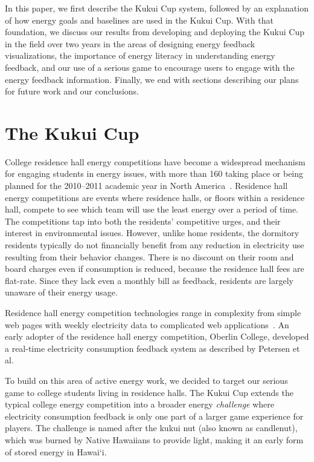 \documentclass[10pt, conference, compsocconf]{IEEEtran-old}
\newcommand{\Hawaii}{Hawai`i\xspace}
\begin{document}
In this paper, we first describe the Kukui Cup system, followed by an explanation of how energy goals and baselines are used in the Kukui Cup. With that foundation, we discuss our results from developing and deploying the Kukui Cup in the field over two years in the areas of designing energy feedback visualizations, the importance of energy literacy in understanding energy feedback, and our use of a serious game to encourage users to engage with the energy feedback information. Finally, we end with sections describing our plans for future work and our conclusions.


\section{The Kukui Cup}

College residence hall energy competitions have become a widespread mechanism for engaging students in energy issues, with more than 160 taking place or being planned for the 2010--2011 academic year in North America~\cite{Hodge2010}. Residence hall energy competitions are events where residence halls, or floors within a residence hall, compete to see which team will use the least energy over a period of time. The competitions tap into both the residents' competitive urges, and their interest in environmental issues. However, unlike home residents, the dormitory residents typically do not financially benefit from any reduction in electricity use resulting from their behavior changes. There is no discount on their room and board charges even if consumption is reduced, because the residence hall fees are flat-rate. Since they lack even a monthly bill as feedback, residents are largely unaware of their energy usage.

Residence hall energy competition technologies range in complexity from simple web pages with weekly electricity data to complicated web applications~\cite[pp. 6--11]{csdl2-11-01}. An early adopter of the residence hall energy competition, Oberlin College, developed a real-time electricity consumption feedback system as described by Petersen et al.~\cite{petersen-dorm-energy-reduction}

To build on this area of active energy work, we decided to target our serious game to college students living in residence halls. The Kukui Cup extends the typical college energy competition into a broader energy \emph{challenge} where electricity consumption feedback is only one part of a larger game experience for players. The challenge is named after the kukui nut (also known as candlenut), which was burned by Native Hawaiians to provide light, making it an early form of stored energy in \Hawaii.
\end{document}
